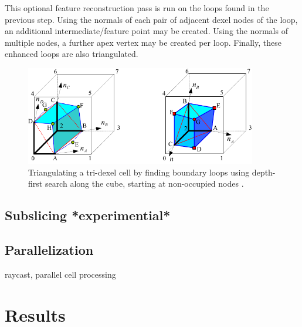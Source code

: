 This optional feature reconstruction pass is run on the loops found in the previous step.
Using the normals of each pair of adjacent dexel nodes of the loop, an additional intermediate/feature point may be created.
Using the normals of multiple nodes, a further apex vertex may be created per loop.
Finally, these enhanced loops are also triangulated.

\begin{figure}
	\centering
	\includegraphics[width=0.9\textwidth]{images/tri_dexel_refinement}
	\caption{
		Triangulating a tri-dexel cell by finding boundary loops using depth-first search along the cube, starting at non-occupied nodes \cite{tri_dexel_refinement}.
	}
	\label{fig:tri_dexel_refinement}
\end{figure}


\subsection{Subslicing *experimential*}
\label{sec:tri_dexel_subslicing}



\subsection{Parallelization}
\label{sec:tri_dexel_parallelization}

raycast, parallel cell processing


\section{Results}
\label{sec:tri_dexel_results}


